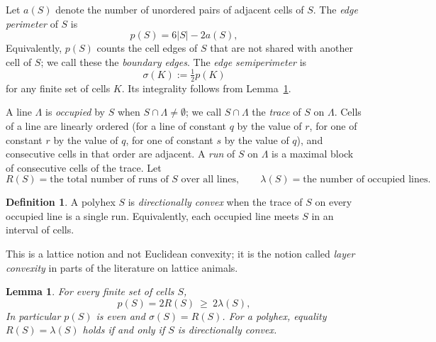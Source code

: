\documentclass[11pt]{article}
\theoremstyle{plain}
\newtheorem{lemma}[theorem]{Lemma}
\theoremstyle{definition}
\newtheorem{definition}[theorem]{Definition}
\theoremstyle{remark}
\begin{document}
Let \(a(S)\) denote the number of unordered pairs of adjacent cells of \(S\). The
\emph{edge perimeter} of \(S\) is
\begin{equation}\label{eq:p}
   p(S)=6|S|-2a(S),
\end{equation}
Equivalently, \(p(S)\) counts the cell edges of \(S\) that are not shared with another
cell of \(S\); we call these the \emph{boundary edges}. The \emph{edge semiperimeter} is
\[
   \sigma(K):=\tfrac{1}{2}p(K)
\]
for any finite set of cells \(K\). Its integrality follows from Lemma~\ref{lem:runs}.

A line \(\Lambda\) is \emph{occupied} by \(S\) when \(S\cap\Lambda\neq\emptyset\); we call
\(S\cap\Lambda\) the \emph{trace} of \(S\) on \(\Lambda\). Cells of a line are linearly
ordered (for a line of constant \(q\) by the value of \(r\), for one of constant \(r\) by
the value of \(q\), for one of constant \(s\) by the value of \(q\)), and consecutive
cells in that order are adjacent. A \emph{run} of \(S\) on \(\Lambda\) is a maximal block
of consecutive cells of the trace. Let
\[
   R(S)=\text{the total number of runs of \(S\) over all lines},\qquad
   \lambda(S)=\text{the number of occupied lines}.
\]

\begin{definition}\label{def:dconv}
A polyhex \(S\) is \emph{directionally convex} when the trace of \(S\) on every occupied
line is a single run. Equivalently, each occupied line meets \(S\) in an interval of cells.
\end{definition}

This is a lattice notion and not Euclidean convexity; it is the notion called
\emph{layer convexity} in parts of the literature on lattice animals.

\begin{lemma}\label{lem:runs}
For every finite set of cells \(S\),
\begin{equation}\label{eq:pruns}
   p(S)=2R(S)\ \ge\ 2\lambda(S),
\end{equation}
In particular \(p(S)\) is even and
\(\sigma(S)=R(S)\). For a polyhex, equality \(R(S)=\lambda(S)\) holds if and only if
\(S\) is directionally convex.
\end{lemma}
\end{document}
